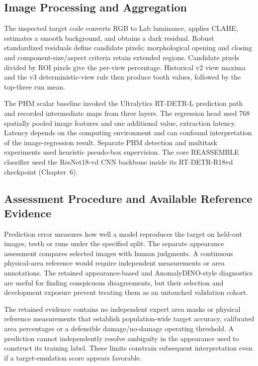 \subsection{Image Processing and Aggregation}
The inspected target code converts RGB to Lab luminance, applies CLAHE, estimates a smooth background, and obtains a dark residual. Robust standardized residuals define candidate pixels; morphological opening and closing and component-size/aspect criteria retain extended regions. Candidate pixels divided by ROI pixels give the per-view percentage. Historical v2 view maxima and the v3 deterministic-view rule then produce tooth values, followed by the top-three run mean.

The PHM scalar baseline invoked the Ultralytics RT-DETR-L prediction path and recorded intermediate maps from three layers. The regression head used 768 spatially pooled image features and one additional value, extraction latency. Latency depends on the computing environment and can confound interpretation of the image-regression result. Separate PHM detection and multitask experiments used heuristic pseudo-box supervision. The core REASSEMBLE classifier used the ResNet18-vd CNN backbone inside its RT-DETR-R18vd checkpoint (Chapter~6).

\subsection{Assessment Procedure and Available Reference Evidence}
Prediction error measures how well a model reproduces the target on held-out images, teeth or runs under the specified split. The separate appearance assessment compares selected images with human judgments. A continuous physical-area reference would require independent measurements or area annotations. The retained appearance-based and AnomalyDINO-style diagnostics are useful for finding conspicuous disagreements, but their selection and development exposure prevent treating them as an untouched validation cohort.

The retained evidence contains no independent expert area masks or physical reference measurements that establish population-wide target accuracy, calibrated area percentages or a defensible damage/no-damage operating threshold. A prediction cannot independently resolve ambiguity in the appearance used to construct its training label. These limits constrain subsequent interpretation even if a target-emulation score appears favorable.

